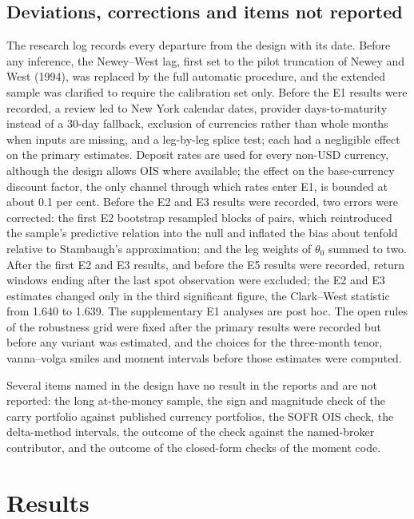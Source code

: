 \documentclass[11pt]{article}
\theoremstyle{result}
\begin{document}
\subsection{Deviations, corrections and items not reported}\label{sec:dev}

The research log records every departure from the design with its date. Before any inference, the Newey--West lag, first set to the pilot truncation of Newey and West (1994), was replaced by the full automatic procedure, and the extended sample was clarified to require the calibration set only. Before the E1 results were recorded, a review led to New York calendar dates, provider days-to-maturity instead of a 30-day fallback, exclusion of currencies rather than whole months when inputs are missing, and a leg-by-leg splice test; each had a negligible effect on the primary estimates. Deposit rates are used for every non-USD currency, although the design allows OIS where available; the effect on the base-currency discount factor, the only channel through which rates enter E1, is bounded at about 0.1 per cent. Before the E2 and E3 results were recorded, two errors were corrected: the first E2 bootstrap resampled blocks of pairs, which reintroduced the sample's predictive relation into the null and inflated the bias about tenfold relative to Stambaugh's approximation; and the leg weights of $\theta_0$ summed to two. After the first E2 and E3 results, and before the E5 results were recorded, return windows ending after the last spot observation were excluded; the E2 and E3 estimates changed only in the third significant figure, the Clark--West statistic from 1.640 to 1.639. The supplementary E1 analyses are post hoc. The open rules of the robustness grid were fixed after the primary results were recorded but before any variant was estimated, and the choices for the three-month tenor, vanna--volga smiles and moment intervals before those estimates were computed.

Several items named in the design have no result in the reports and are not reported: the long at-the-money sample, the sign and magnitude check of the carry portfolio against published currency portfolios, the SOFR OIS check, the delta-method intervals, the outcome of the check against the named-broker contributor, and the outcome of the closed-form checks of the moment code.

\section{Results}\label{sec:results}
\end{document}

